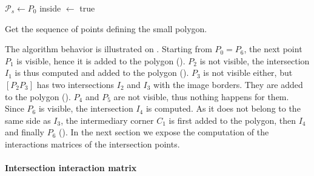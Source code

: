 \documentclass[letterpaper, 10 pt, conference]{IEEEtran}  %
\begin{document}
\begin{algorithm}[!t]
{}
$\mathcal{P}_s \gets P_0$\;
inside $\gets$ true\;
\caption{Get the sequence of points defining the small polygon.}
\label{algo:smallpoly}
\end{algorithm}


The algorithm behavior is illustrated on . Starting from $P_0=P_6$, the next point $P_1$ is visible, hence it is added to the polygon ().
$P_2$ is not visible, the intersection $I_1$ is thus computed and added to the polygon ().
$P_3$ is not visible either, but $[P_2P_3]$ has two intersections $I_2$ and $I_3$ with the image borders. They are added to the polygon ().
$P_4$ and $P_5$ are not visible, thus nothing happens for them.
Since $P_6$ is visible, the intersection $I_4$ is computed. As it does not belong to the same side as $I_3$, the intermediary corner $C_1$ is first added to the polygon, then $I_4$ and finally $P_6$ ().
In the next section we expose the computation of the interactions matrices of the intersection points.

\paragraph{Intersection interaction matrix}
\end{document}
